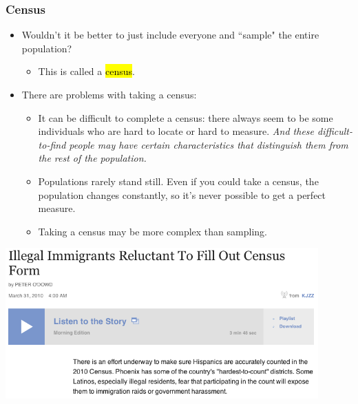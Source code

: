 \begin{frame}
\frametitle{Census}

\begin{itemize}

\item Wouldn't it be better to just include everyone and ``sample" the entire population? 

\begin{itemize}
\item This is called a \hl{census}.
\end{itemize}

\pause

\item There are problems with taking a census:

\begin{itemize}
\item It can be difficult to complete a census: there always seem to be some individuals who are hard to locate or hard to measure. \textit{And these difficult-to-find people may have certain characteristics that distinguish them from the rest of the population.}
\item Populations rarely stand still. Even if you could take a census, the population changes constantly, so it's never possible to get a perfect measure.
\item Taking a census may be more complex than sampling.
\end{itemize}

\end{itemize}

\end{frame}


\begin{frame}

\vfill

\begin{center}
\includegraphics[width=0.90\textwidth]{1-3_data_collection_principles/figures/census_illegal_immig}
\end{center}


\end{frame}

